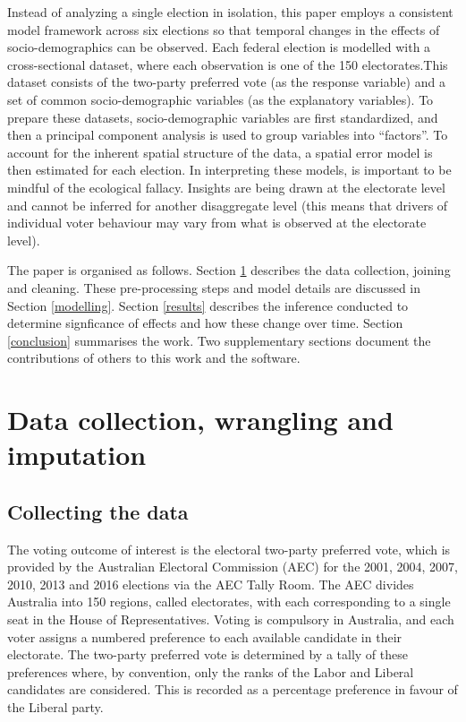 \documentclass[times, doublespace]{anzsauth}
\begin{document}
Instead of analyzing a single election in isolation, this paper employs a consistent model framework across six elections so that temporal changes in the effects of socio-demographics can be observed. Each federal election is modelled with a cross-sectional dataset, where each observation is one of the 150 electorates.This dataset consists of the two-party preferred vote (as the response variable) and a set of common socio-demographic variables (as the explanatory variables). To prepare these datasets, socio-demographic variables are first standardized, and then a principal component analysis is used to group variables into ``factors''. To account for the inherent spatial structure of the data, a spatial error model is then estimated for each election. In interpreting these models, is important to be mindful of the ecological fallacy. Insights are being drawn at the electorate level and cannot be inferred for another disaggregate level (this means that drivers of individual voter behaviour may vary from what is observed at the electorate level).

The paper is organised as follows. Section \ref{data} describes the data collection, joining and cleaning. These pre-processing steps and model details are discussed in Section \ref{modelling}. Section \ref{results} describes the inference conducted to determine signficance of effects and how these change over time. Section \ref{conclusion} summarises the work. Two supplementary sections document the contributions of others to this work and the software.

\hypertarget{data}{%
\section{Data collection, wrangling and imputation}\label{data}}

\hypertarget{collecting-the-data}{%
\subsection{Collecting the data}\label{collecting-the-data}}

The voting outcome of interest is the electoral two-party preferred vote, which is provided by the Australian Electoral Commission (AEC) for the 2001, 2004, 2007, 2010, 2013 and 2016 elections via the AEC Tally Room. The AEC divides Australia into 150 regions, called electorates, with each corresponding to a single seat in the House of Representatives. Voting is compulsory in Australia, and each voter assigns a numbered preference to each available candidate in their electorate. The two-party preferred vote is determined by a tally of these preferences where, by convention, only the ranks of the Labor and Liberal candidates are considered. This is recorded as a percentage preference in favour of the Liberal party.
\end{document}
